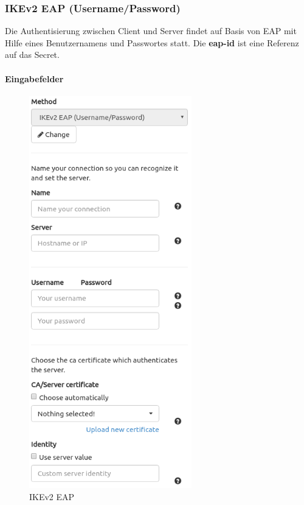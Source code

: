 \subsubsection{IKEv2 EAP (Username/Password)}
Die Authentisierung zwischen Client und Server findet auf Basis von EAP mit Hilfe eines Benutzernamens und Passwortes statt.
Die \textbf{eap-id} ist eine Referenz auf das Secret.

\noindent\begin{minipage}[t]{0.5\textwidth}
\vspace{0pt}
\paragraph{Eingabefelder}\mbox{}\medskip
    \begin{figure}[H]
    	\centering
    	\includegraphics[width=200pt]{images/ike_eap.png}
    	\caption{IKEv2 EAP}
    \end{figure}
\end{minipage}
\hfill
